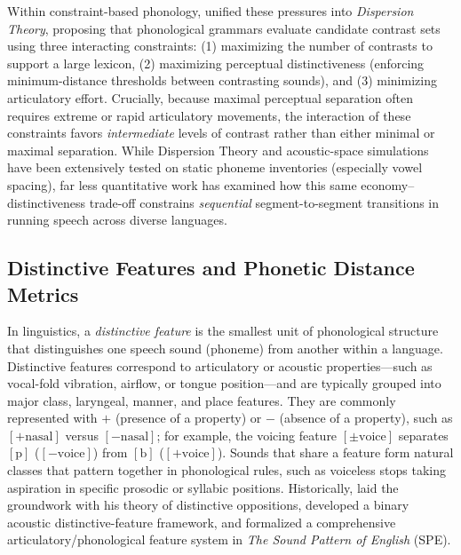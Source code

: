 \documentclass[cm]{glossa}
\begin{document}
Within constraint-based phonology, \citet{flemming2004} unified these pressures into \emph{Dispersion Theory}, proposing that phonological grammars evaluate candidate contrast sets using three interacting constraints: (1) maximizing the number of contrasts to support a large lexicon, (2) maximizing perceptual distinctiveness (enforcing minimum-distance thresholds between contrasting sounds), and (3) minimizing articulatory effort. Crucially, because maximal perceptual separation often requires extreme or rapid articulatory movements, the interaction of these constraints favors \emph{intermediate} levels of contrast rather than either minimal or maximal separation. While Dispersion Theory and acoustic-space simulations have been extensively tested on static phoneme inventories (especially vowel spacing), far less quantitative work has examined how this same economy--distinctiveness trade-off constrains \emph{sequential} segment-to-segment transitions in running speech across diverse languages.

\subsection{Distinctive Features and Phonetic Distance Metrics}
In linguistics, a \emph{distinctive feature} is the smallest unit of phonological structure that distinguishes one speech sound (phoneme) from another within a language. Distinctive features correspond to articulatory or acoustic properties---such as vocal-fold vibration, airflow, or tongue position---and are typically grouped into major class, laryngeal, manner, and place features. They are commonly represented with $+$ (presence of a property) or $-$ (absence of a property), such as $[+\text{nasal}]$ versus $[-\text{nasal}]$; for example, the voicing feature $[\pm\text{voice}]$ separates $[\text{p}]$ ($[-\text{voice}]$) from $[\text{b}]$ ($[+\text{voice}]$). Sounds that share a feature form natural classes that pattern together in phonological rules, such as voiceless stops taking aspiration in specific prosodic or syllabic positions. Historically, \citet{trubetzkoy1939} laid the groundwork with his theory of distinctive oppositions, \citet{jakobson1952} developed a binary acoustic distinctive-feature framework, and \citet{chomsky1968} formalized a comprehensive articulatory/phonological feature system in \emph{The Sound Pattern of English} (SPE).
\end{document}
